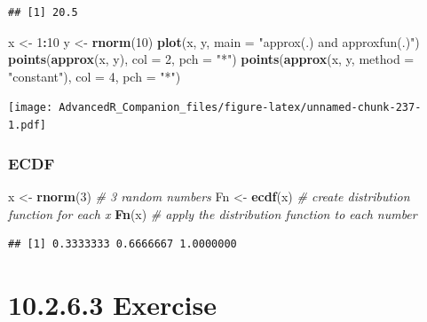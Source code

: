 \documentclass[]{book}
\newenvironment{Shaded}{\begin{snugshade}}{\end{snugshade}}
\newcommand{\CommentTok}[1]{\textcolor[rgb]{0.56,0.35,0.01}{\textit{#1}}}
\newcommand{\DataTypeTok}[1]{\textcolor[rgb]{0.13,0.29,0.53}{#1}}
\newcommand{\DecValTok}[1]{\textcolor[rgb]{0.00,0.00,0.81}{#1}}
\newcommand{\KeywordTok}[1]{\textcolor[rgb]{0.13,0.29,0.53}{\textbf{#1}}}
\newcommand{\NormalTok}[1]{#1}
\newcommand{\OperatorTok}[1]{\textcolor[rgb]{0.81,0.36,0.00}{\textbf{#1}}}
\newcommand{\StringTok}[1]{\textcolor[rgb]{0.31,0.60,0.02}{#1}}
\begin{document}
\begin{verbatim}
## [1] 20.5
\end{verbatim}

\begin{Shaded}
\begin{Highlighting}[]
\NormalTok{x <-}\StringTok{ }\DecValTok{1}\OperatorTok{:}\DecValTok{10}
\NormalTok{y <-}\StringTok{ }\KeywordTok{rnorm}\NormalTok{(}\DecValTok{10}\NormalTok{)}
\KeywordTok{plot}\NormalTok{(x, y, }\DataTypeTok{main =} \StringTok{"approx(.) and approxfun(.)"}\NormalTok{)}
\KeywordTok{points}\NormalTok{(}\KeywordTok{approx}\NormalTok{(x, y), }\DataTypeTok{col =} \DecValTok{2}\NormalTok{, }\DataTypeTok{pch =} \StringTok{"*"}\NormalTok{)}
\KeywordTok{points}\NormalTok{(}\KeywordTok{approx}\NormalTok{(x, y, }\DataTypeTok{method =} \StringTok{"constant"}\NormalTok{), }\DataTypeTok{col =} \DecValTok{4}\NormalTok{, }\DataTypeTok{pch =} \StringTok{"*"}\NormalTok{)}
\end{Highlighting}
\end{Shaded}

\texttt{[image: AdvancedR\_Companion\_files/figure-latex/unnamed-chunk-237-1.pdf]}

\hypertarget{ecdf}{%
\subsubsection*{ECDF}\label{ecdf}}

\begin{Shaded}
\begin{Highlighting}[]
\NormalTok{x <-}\StringTok{ }\KeywordTok{rnorm}\NormalTok{(}\DecValTok{3}\NormalTok{) }\CommentTok{# 3 random numbers}
\NormalTok{Fn <-}\StringTok{ }\KeywordTok{ecdf}\NormalTok{(x) }\CommentTok{# create distribution function for each x}
\KeywordTok{Fn}\NormalTok{(x) }\CommentTok{# apply the distribution function to each number}
\end{Highlighting}
\end{Shaded}

\begin{verbatim}
## [1] 0.3333333 0.6666667 1.0000000
\end{verbatim}

\hypertarget{exercise-14}{%
\section*{10.2.6.3 Exercise}\label{exercise-14}}
\end{document}
